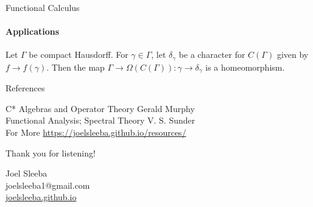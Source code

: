 \documentclass[dvipsnames]{beamer}
\newcommand{\1}{\mathds{1}}	%
\begin{document}
\begin{frame}{Functional Calculus}
  \framesubtitle{Applications}
  \begin{theorem}
    Let $\Gamma$ be compact Hausdorff. For $\gamma \in \Gamma$, let $\delta_\gamma$ be a character for $C(\Gamma)$ given by $f \to f(\gamma)$. Then the map $\Gamma \to \Omega(C(\Gamma)): \gamma \to \delta_\gamma$ is a homeomorphism.
  \end{theorem}
\end{frame}



\begin{frame}{References}
\begin{thebibliography}{10}
\beamertemplatearticlebibitems
{\small

C* Algebras and Operator Theory
\newblock Gerald Murphy \\

Functional Analysis; Spectral Theory
\newblock V. S. Sunder\\

  For More
\newblock \url{https://joelsleeba.github.io/resources/}
}
\end{thebibliography}
\end{frame}


\begin{frame}
\begin{center}
{\large\color{titleText} Thank you for listening!}
\vspace{1cm}

Joel Sleeba \\[1em]
joelsleeba1@gmail.com \\
  \href{https://joelsleeba.github.io}{joelsleeba.github.io}
\end{center}
\end{frame}

\end{document}
